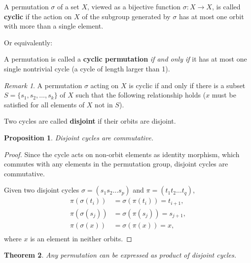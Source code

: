 \documentclass[12pt, letterpaper]{article}
\newtheorem{prop}{Proposition}[section]
\newtheorem{thm}[prop]{Theorem}
\theoremstyle{definition}
\theoremstyle{remark}
\newtheorem*{rem*}{Remark}
\theoremstyle{definition}
\theoremstyle{plain}
\numberwithin{equation}{section}
\begin{document}
	\begin{def*}
		A permutation $\sigma$ of a set $X$, viewed as a bijective function $\sigma \colon X\to X$,
		is called \textbf{cyclic} if the action on $X$ of the subgroup generated by $\sigma$
		has at most one orbit with more than a single element.
	\end{def*}

	Or equivalently:
	\begin{def*}
		A permutation is called a \textbf{cyclic permutation} \textit{if and only if}
		it has at most one single nontrivial cycle (a cycle of length larger than 1).
	\end{def*}
	\begin{rem*}
		A permutation $\sigma$ acting on $X$ is cyclic
		if and only if there is a subset $S=\{s_1,s_2,\dots,s_k\}$ of $X$ such that
		the following relationship holds ($x$ must be satisfied for all elements of $X$ not in $S$).
		\begin{center}
		\end{center}
	\end{rem*}
	\begin{def*}
		Two cycles are called \textbf{disjoint} if their orbits are disjoint.
	\end{def*}
	\begin{prop}\label{propCommutativeDisjointCycle}
		Disjoint cycles are commutative.
	\end{prop}
	\begin{proof}
		Since the cycle acts on non-orbit elements as identity morphism,
		which commutes with any elements in the permutation group,
		disjoint cycles are commutative.
		
		Given two disjoint cycles $\sigma=(s_1s_2\dots s_p)$ and $\pi=(t_1t_2\dots t_q)$,
		\[
		\begin{aligned}
			\pi(\sigma(t_i))&=\sigma(\pi(t_i))=t_{i+1},\\
			\pi(\sigma(s_j))&=\sigma(\pi(s_j))=s_{j+1},\\
			\pi(\sigma(x))&=\sigma(\pi(x))=x,\\
		\end{aligned}
		\]
		where $x$ is an element in neither orbits.
	\end{proof}
	\begin{thm}\label{thmPermutationExpression}
		Any permutation can be expressed as product of disjoint cycles.
	\end{thm}
\end{document}
